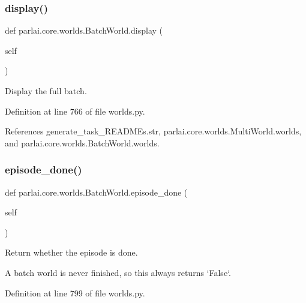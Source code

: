 \subsubsection{\texorpdfstring{display()}{display()}}
{\footnotesize\ttfamily def parlai.\+core.\+worlds.\+Batch\+World.\+display (\begin{DoxyParamCaption}\item[{}]{self }\end{DoxyParamCaption})}

\begin{DoxyVerb}Display the full batch.\end{DoxyVerb}
 

Definition at line 766 of file worlds.\+py.



References generate\+\_\+task\+\_\+\+R\+E\+A\+D\+M\+Es.\+str, parlai.\+core.\+worlds.\+Multi\+World.\+worlds, and parlai.\+core.\+worlds.\+Batch\+World.\+worlds.

\mbox{\label{classparlai_1_1core_1_1worlds_1_1BatchWorld_aa3ef1275372635073ba5cba7df0d1f5d}} 
\subsubsection{\texorpdfstring{episode\+\_\+done()}{episode\_done()}}
{\footnotesize\ttfamily def parlai.\+core.\+worlds.\+Batch\+World.\+episode\+\_\+done (\begin{DoxyParamCaption}\item[{}]{self }\end{DoxyParamCaption})}

\begin{DoxyVerb}Return whether the episode is done.

A batch world is never finished, so this always returns `False`.
\end{DoxyVerb}
 

Definition at line 799 of file worlds.\+py.

\mbox{\label{classparlai_1_1core_1_1worlds_1_1BatchWorld_a006891b1446ef6e593edda1c91cab809}} 
